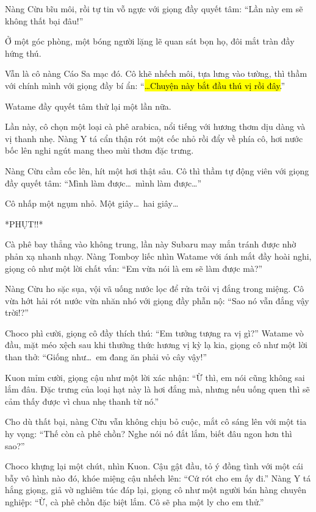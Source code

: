 \documentclass[../main.tex]{subfiles}
\begin{document}
Nàng Cừu bĩu môi, rồi tự tin vỗ ngực với giọng đầy quyết tâm: ``Lần này em sẽ không thất bại đâu!''

\il

Ở một góc phòng, một bóng người lặng lẽ quan sát bọn họ, đôi mắt tràn đầy hứng thú.

Vẫn là cô nàng Cáo Sa mạc đó. Cô khẽ nhếch môi, tựa lưng vào tường, thì thầm với chính mình với giọng đầy bí ẩn: ``\hl{\dots Chuyện này bắt đầu thú vị rồi đây.}''

\il

\ct

Watame đầy quyết tâm thử lại một lần nữa.

Lần này, cô chọn một loại cà phê arabica, nổi tiếng với hương thơm dịu dàng và vị thanh nhẹ. Nàng Y tá cẩn thận rót một cốc nhỏ rồi đẩy về phía cô, hơi nước bốc lên nghi ngút mang theo mùi thơm đặc trưng.

Nàng Cừu cầm cốc lên, hít một hơi thật sâu. Cô thì thầm tự động viên với giọng đầy quyết tâm: ``Mình làm được\dots\ mình làm được\dots''

Cô nhấp một ngụm nhỏ. Một giây\dots\ hai giây\dots

*PHỤT!!*

Cà phê bay thẳng vào không trung, lần này Subaru may mắn tránh được nhờ phản xạ nhanh nhạy. Nàng Tomboy liếc nhìn Watame với ánh mắt đầy hoài nghi, giọng cô như một lời chất vấn: ``Em vừa nói là em sẽ làm được mà?''

Nàng Cừu ho sặc sụa, vội vã uống nước lọc để rửa trôi vị đắng trong miệng. Cô vừa hớt hải rót nước vừa nhăn nhó với giọng đầy phẫn nộ: ``Sao nó vẫn đắng vậy trời!?''

Choco phì cười, giọng cô đầy thích thú: ``Em tưởng tượng ra vị gì?'' Watame vò đầu, mặt méo xệch sau khi thưởng thức hương vị kỳ lạ kia, giọng cô như một lời than thở: ``Giống như\dots\ em đang ăn phải vỏ cây vậy!''

Kuon mỉm cười, giọng cậu như một lời xác nhận: ``Ừ thì, em nói cũng không sai lắm đâu. Đặc trưng của loại hạt này là hơi đắng mà, nhưng nếu uống quen thì sẽ cảm thấy được vì chua nhẹ thanh từ nó.''

Cho dù thất bại, nàng Cừu vẫn không chịu bỏ cuộc, mắt cô sáng lên với một tia hy vọng: ``Thế còn cà phê chồn? Nghe nói nó đắt lắm, biết đâu ngon hơn thì sao?''

Choco khựng lại một chút, nhìn Kuon. Cậu gật đầu, tỏ ý đồng tình với một cái bẫy vô hình nào đó, khóe miệng cậu nhếch lên: ``Cứ rót cho em ấy đi.'' Nàng Y tá hắng giọng, giả vờ nghiêm túc đáp lại, giọng cô như một người bán hàng chuyên nghiệp: ``Ừ, cà phê chồn đặc biệt lắm. Cô sẽ pha một ly cho em thử.''
\end{document}
